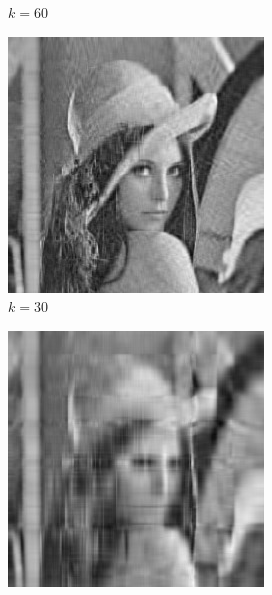 \documentclass[a4paper]{article}
\begin{document}
\begin{figure}[H]
\begin{subfigure}[b]{0.22\textwidth}
                \caption{$k=60$}
                \label{fig:compressed60}
        \end{subfigure}\hfill
        \begin{subfigure}[b]{0.22\textwidth}
                \centering
                \includegraphics[width=\linewidth]{compressed30}
                \caption{$k=30$}
                \label{fig:compressed30}
        \end{subfigure}\hfill
        \begin{subfigure}[b]{0.22\textwidth}
                \centering
                \includegraphics[width=\linewidth]{compressed10}

\end{subfigure}
\end{figure}
\end{document}
